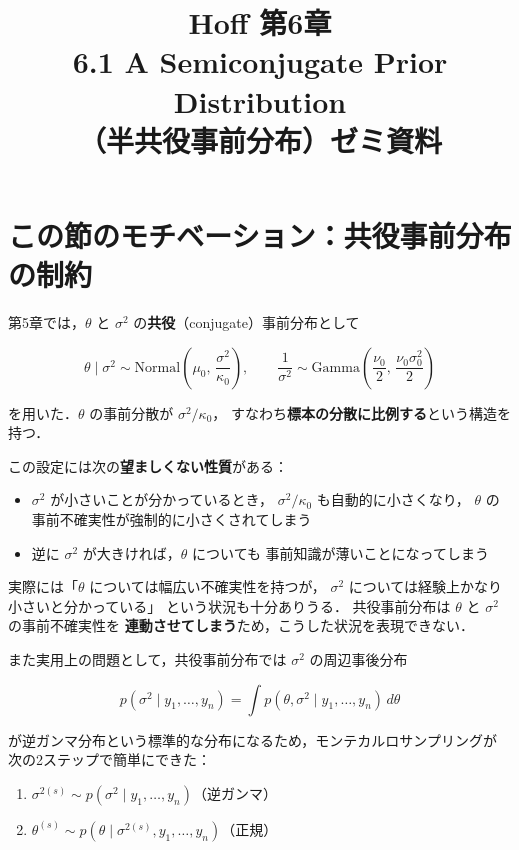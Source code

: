 \documentclass[lualatex,ja=standard,a4paper,12pt]{bxjsarticle}
\title{{\large Hoff 第6章} \\[6pt]
       \textbf{6.1\; A Semiconjugate Prior Distribution} \\[4pt]
       {\normalsize （半共役事前分布）ゼミ資料}}
\author{}
\date{}
\begin{document}
\maketitle
\thispagestyle{empty}

\section{この節のモチベーション：共役事前分布の制約}

第5章では，$\theta$ と $\sigma^2$ の\textbf{共役}（conjugate）事前分布として

\[
  \theta \mid \sigma^2 \sim \mathrm{Normal}\!\left(\mu_0,\, \frac{\sigma^2}{\kappa_0}\right),
  \qquad
  \frac{1}{\sigma^2} \sim \mathrm{Gamma}\!\left(\frac{\nu_0}{2},\, \frac{\nu_0 \sigma_0^2}{2}\right)
\]

を用いた．$\theta$ の事前分散が $\sigma^2/\kappa_0$，
すなわち\textbf{標本の分散に比例する}という構造を持つ．

\medskip
この設定には次の\textbf{望ましくない性質}がある：

\begin{itemize}
  \item $\sigma^2$ が小さいことが分かっているとき，
        $\sigma^2/\kappa_0$ も自動的に小さくなり，
        $\theta$ の事前不確実性が強制的に小さくされてしまう
  \item 逆に $\sigma^2$ が大きければ，$\theta$ についても
        事前知識が薄いことになってしまう
\end{itemize}

実際には「$\theta$ については幅広い不確実性を持つが，
$\sigma^2$ については経験上かなり小さいと分かっている」
という状況も十分ありうる．
共役事前分布は $\theta$ と $\sigma^2$ の事前不確実性を
\textbf{連動させてしまう}ため，こうした状況を表現できない．

\medskip
また実用上の問題として，共役事前分布では $\sigma^2$ の周辺事後分布

\[
  p(\sigma^2 \mid y_1, \ldots, y_n) = \int p(\theta, \sigma^2 \mid y_1, \ldots, y_n)\,d\theta
\]

が逆ガンマ分布という標準的な分布になるため，モンテカルロサンプリングが
次の2ステップで簡単にできた：

\begin{enumerate}
  \item $\sigma^{2(s)} \sim p(\sigma^2 \mid y_1, \ldots, y_n)$（逆ガンマ）
  \item $\theta^{(s)} \sim p(\theta \mid \sigma^{2(s)}, y_1, \ldots, y_n)$（正規）
\end{enumerate}
\end{document}
